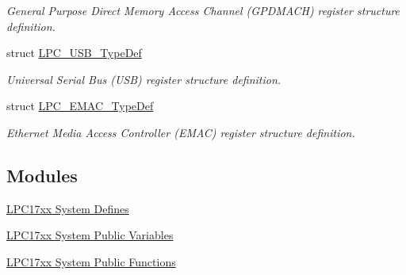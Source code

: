 \begin{DoxyCompactItemize}
\begin{DoxyCompactList}\small\item\em \-General \-Purpose \-Direct \-Memory \-Access \-Channel (\-G\-P\-D\-M\-A\-C\-H) register structure definition. \end{DoxyCompactList}\item 
struct \hyperlink{struct_l_p_c___u_s_b___type_def}{\-L\-P\-C\-\_\-\-U\-S\-B\-\_\-\-Type\-Def}
\begin{DoxyCompactList}\small\item\em \-Universal \-Serial \-Bus (\-U\-S\-B) register structure definition. \end{DoxyCompactList}\item 
struct \hyperlink{struct_l_p_c___e_m_a_c___type_def}{\-L\-P\-C\-\_\-\-E\-M\-A\-C\-\_\-\-Type\-Def}
\begin{DoxyCompactList}\small\item\em \-Ethernet \-Media \-Access \-Controller (\-E\-M\-A\-C) register structure definition. \end{DoxyCompactList}\end{DoxyCompactItemize}
\subsection*{\-Modules}
\begin{DoxyCompactItemize}
\item 
\hyperlink{group___l_p_c17xx___system___defines}{\-L\-P\-C17xx System Defines}
\item 
\hyperlink{group___l_p_c17xx___system___public___variables}{\-L\-P\-C17xx System Public Variables}
\item 
\hyperlink{group___l_p_c17xx___system___public___functions}{\-L\-P\-C17xx System Public Functions}
\end{DoxyCompactItemize}
